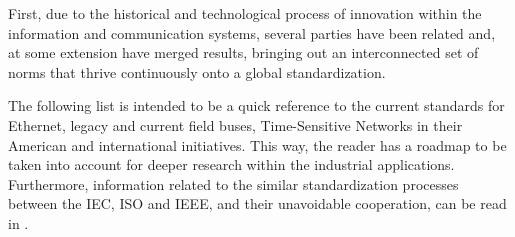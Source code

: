 First, due to the historical and technological process of innovation within the information and communication 
systems, several parties have been related and, at some extension have merged results, bringing out an interconnected 
set of norms that thrive continuously onto a global standardization.

The following list is intended to be a quick reference to the current standards for Ethernet, legacy and current field buses, 
Time-Sensitive Networks in their American and international initiatives. This way, the reader has a roadmap to be taken into
account for deeper research within the industrial applications. 
Furthermore, information related to the similar standardization processes between 
the IEC, ISO and IEEE, and their unavoidable cooperation, can be read in \cite{standards_coop}. %

